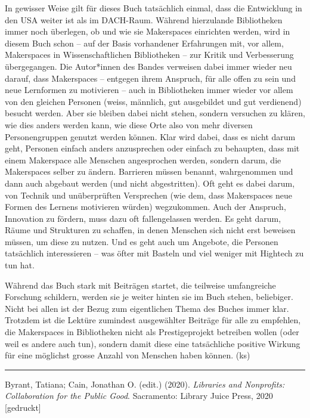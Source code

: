 \documentclass[a4paper,
fontsize=11pt,
oneside,
numbers=noperiodatend,
parskip=half-,
bibliography=totoc,
final
]{scrartcl}
\begin{document}
In gewisser Weise gilt für dieses Buch tatsächlich einmal, dass die
Entwicklung in den USA weiter ist als im DACH-Raum. Während hierzulande
Bibliotheken immer noch überlegen, ob und wie sie Makerspaces einrichten
werden, wird in diesem Buch schon -- auf der Basis vorhandener
Erfahrungen mit, vor allem, Makerspaces in Wissenschaftlichen
Bibliotheken -- zur Kritik und Verbesserung übergegangen. Die
Autor*innen des Bandes verweisen dabei immer wieder neu darauf, dass
Makerspaces -- entgegen ihrem Anspruch, für alle offen zu sein und neue
Lernformen zu motivieren -- auch in Bibliotheken immer wieder vor allem
von den gleichen Personen (weiss, männlich, gut ausgebildet und gut
verdienend) besucht werden. Aber sie bleiben dabei nicht stehen, sondern
versuchen zu klären, wie dies anders werden kann, wie diese Orte also
von mehr diversen Personengruppen genutzt werden können. Klar wird
dabei, dass es nicht darum geht, Personen einfach anders anzusprechen
oder einfach zu behaupten, dass mit einem Makerspace alle Menschen
angesprochen werden, sondern darum, die Makerspaces selber zu ändern.
Barrieren müssen benannt, wahrgenommen und dann auch abgebaut werden
(und nicht abgestritten). Oft geht es dabei darum, von Technik und
unüberprüften Versprechen (wie dem, dass Makerspaces neue Formen des
Lernens motivieren würden) wegzukommen. Auch der Anspruch, Innovation zu
fördern, muss dazu oft fallengelassen werden. Es geht darum, Räume und
Strukturen zu schaffen, in denen Menschen sich nicht erst beweisen
müssen, um diese zu nutzen. Und es geht auch um Angebote, die Personen
tatsächlich interessieren -- was öfter mit Basteln und viel weniger mit
Hightech zu tun hat.

Während das Buch stark mit Beiträgen startet, die teilweise umfangreiche
Forschung schildern, werden sie je weiter hinten sie im Buch stehen,
beliebiger. Nicht bei allen ist der Bezug zum eigentlichen Thema des
Buches immer klar. Trotzdem ist die Lektüre zumindest ausgewählter
Beiträge für alle zu empfehlen, die Makerspaces in Bibliotheken nicht
als Prestigeprojekt betreiben wollen (oder weil es andere auch tun),
sondern damit diese eine tatsächliche positive Wirkung für eine
möglichst grosse Anzahl von Menschen haben können. (ks)

\begin{center}\rule{0.5\linewidth}{0.5pt}\end{center}

Byrant, Tatiana; Cain, Jonathan O. (edit.) (2020). \emph{Libraries and
Nonprofits: Collaboration for the Public Good}. Sacramento: Library
Juice Press, 2020 {[}gedruckt{]}
\end{document}
